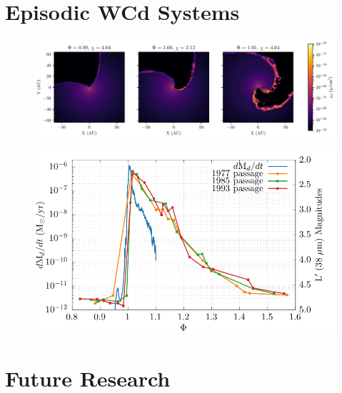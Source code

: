 \documentclass[portrait,a0]{a0poster}
\begin{document}
\begin{multicols}{2}
      \section*{Episodic WCd Systems}

      \begin{figure}[H]
        \centering
        \includegraphics[width=\linewidth]{assets/periastron-3-rhod.pdf}
      \end{figure}

      \begin{figure}[H]
        \centering
        \includegraphics[width=\linewidth]{assets/magnitudes.pdf}
      \end{figure}

      \section*{Future Research}

    \end{multicols}
\end{document}
